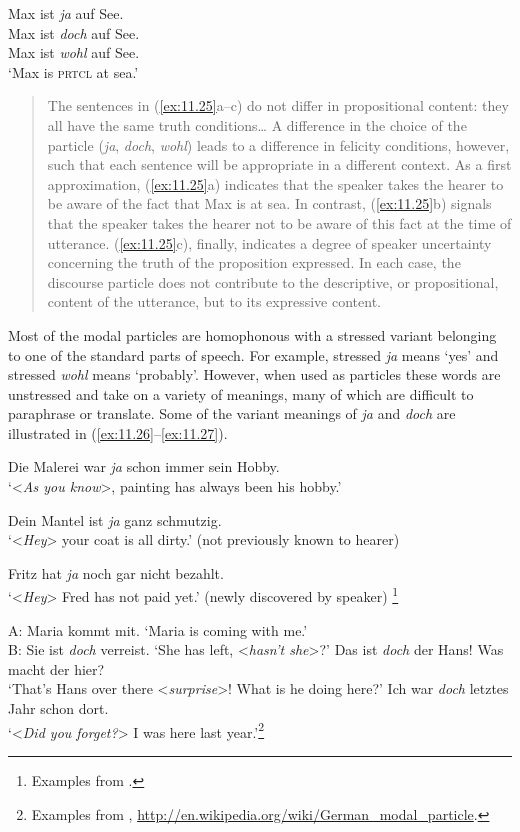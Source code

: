 \ea \label{ex:11.25}
\ea  Max ist \textit{ja} auf See.\\
\ex Max ist \textit{doch} auf See.\\
\ex Max ist \textit{wohl} auf See.\\
‘Max is \textsc{prtcl} at sea.’
\z

\begin{quote}
The sentences in (\ref{ex:11.25}a–c) do not differ in propositional content: they all have the same truth conditions…  A difference in the choice of the particle (\textit{ja}, \textit{doch}, \textit{wohl}) leads to a difference in felicity conditions, however, such that each sentence will be appropriate in a different context. As a first approximation, (\ref{ex:11.25}a) indicates that the speaker takes the hearer to be aware of the fact that Max is at sea. In contrast, (\ref{ex:11.25}b) signals that the speaker takes the hearer not to be aware of this fact at the time of utterance. (\ref{ex:11.25}c), finally, indicates a degree of speaker uncertainty concerning the truth of the proposition expressed. In each case, the discourse particle does not contribute to the descriptive, or propositional, content of the utterance, but to its expressive content.
\end{quote}
\z


Most of the  modal particles are homophonous with a stressed variant belonging to one of the standard parts of speech. For example, stressed \textit{ja} means ‘yes’ and stressed \textit{wohl} means ‘probably’. However, when used as particles these words are unstressed and take on a variety of meanings, many of which are difficult to paraphrase or translate. Some of the variant meanings of \textit{ja} and \textit{doch} are illustrated in (\ref{ex:11.26}--\ref{ex:11.27}).


\ea \label{ex:11.26}
\ea  Die Malerei war \textit{ja} schon immer sein Hobby.\\
\glt ‘<\textit{As you know}>, painting has always been his hobby.’

\ex  Dein Mantel ist \textit{ja} ganz schmutzig.\\
\glt ‘<\textit{Hey}> your coat is all dirty.’ (not previously known to hearer)

\ex Fritz hat \textit{ja} noch gar nicht bezahlt.\\
\glt ‘<\textit{Hey}> Fred has not paid yet.’ (newly discovered by speaker)
\footnote{Examples from \citealt{König1991,KönigEtAl1990,Waltereit2001}.}
\z \z

\ea \label{ex:11.27} \ea  A: Maria kommt mit. ‘Maria is coming with me.’\\
    B: Sie ist \textit{doch} verreist. ‘She has left, <\textit{hasn’t she}>?’
\ex  Das ist \textit{doch} der Hans! Was macht der hier?\\
‘That’s Hans over there <\textit{surprise}>! What is he doing here?’
\ex Ich war \textit{doch} letztes Jahr schon dort.\\
‘<\textit{Did you forget?}> I was here last year.’\footnote{Examples from \citet{Karagjosova2000,Grosz2010}, \url{http://en.wikipedia.org/wiki/German_modal_particle}.}
\z \z 


